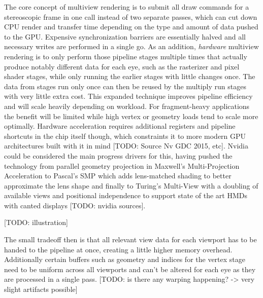 The core concept of multiview rendering is to submit all draw commands for a stereoscopic frame in one call instead of two separate passes, which can cut down CPU render and transfer time depending on the type and amount of data pushed to the GPU. Expensive synchronization barriers are essentially halved and all necessary writes are performed in a single go. 
As an addition, \textit{hardware} multiview rendering is to only perform those pipeline stages multiple times that actually produce notably different data for each eye, such as the rasterizer and pixel shader stages, while only running the earlier stages with little changes once. The data from stages run only once can then be reused by the multiply run stages with very little extra cost. This expanded technique improves pipeline efficiency and will scale heavily depending on workload. For fragment-heavy applications the benefit will be limited while high vertex or geometry loads tend to scale more optimally. Hardware acceleration requires additional registers and pipeline shortcuts in the chip itself though, which constraints it to more modern GPU architectures built with it in mind [TODO: Source Nv GDC 2015, etc]. Nvidia could be considered the main progress drivers for this, having pushed the technology from parallel geometry projection in Maxwell's Multi-Projection Acceleration to Pascal's SMP which adds lens-matched shading to better approximate the lens shape and finally to Turing's Multi-View with a doubling of available views and positional independence to support state of the art HMDs with canted displays [TODO: nvidia sources]. 

[TODO: illustration]

The small tradeoff then is that all relevant view data for each viewport has to be handed to the pipeline at once, creating a little higher memory overhead. Additionally certain buffers such as geometry and indices for the vertex stage need to be uniform across all viewports and can't be altered for each eye as they are processed in a single pass. [TODO: is there any warping happening? -> very slight artifacts possible] \\

